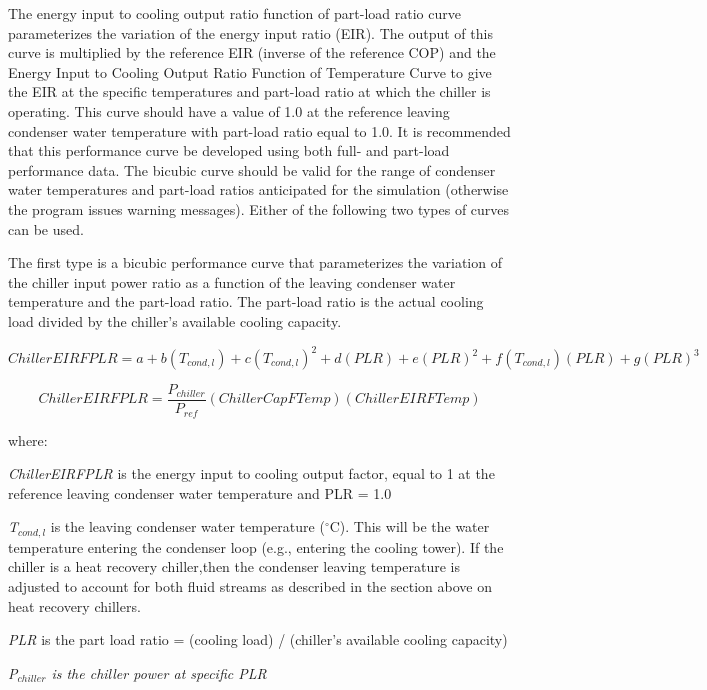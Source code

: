 The energy input to cooling output ratio function of part-load ratio curve parameterizes the variation of the energy input ratio (EIR). The output of this curve is multiplied by the reference EIR (inverse of the reference COP) and the Energy Input to Cooling Output Ratio Function of Temperature Curve to give the EIR at the specific temperatures and part-load ratio at which the chiller is operating. This curve should have a value of 1.0 at the reference leaving condenser water temperature with part-load ratio equal to 1.0. It is recommended that this performance curve be developed using both full- and part-load performance data. The bicubic curve should be valid for the range of condenser water temperatures and part-load ratios anticipated for the simulation (otherwise the program issues warning messages). Either of the following two types of curves can be used.

The first type is a bicubic performance curve that parameterizes the variation of the chiller input power ratio as a function of the leaving condenser water temperature and the part-load ratio. The part-load ratio is the actual cooling load divided by the chiller's available cooling capacity.

\begin{equation}
ChillerEIRFPLR = a + b({T_{cond,l}}) + c{({T_{cond,l}})^2} + d(PLR) + e{(PLR)^2} + f({T_{cond,l}})(PLR) + g{(PLR)^3}
\end{equation}

\begin{equation}
  ChillerEIRFPLR = \frac{P_{chiller}}{P_{ref}}\left( {ChillerCapFTemp} \right)\left( {ChillerEIRFTemp} \right)
\end{equation}

where:

\emph{ChillerEIRFPLR} is the energy input to cooling output factor, equal to 1 at the reference leaving condenser water temperature and PLR = 1.0

\emph{T\(_{cond,l}\)} is the leaving condenser water temperature (\(^{\circ}\)C). This will be the water temperature entering the condenser loop (e.g., entering the cooling tower). If the chiller is a heat recovery chiller,then the condenser leaving temperature is adjusted to account for both fluid streams as described in the section above on heat recovery chillers.

\emph{PLR} is the part load ratio = (cooling load) / (chiller's available cooling capacity)

\emph{P\(_{chiller}\) is the chiller power at specific PLR}

